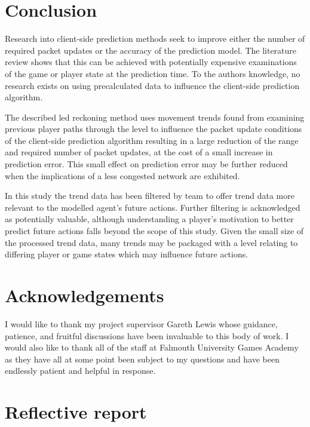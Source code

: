 \documentclass[journal]{IEEEtran}
\begin{document}
\section{Conclusion}

Research into client-side prediction methods seek to improve either the number of required packet updates or the accuracy of the prediction model. The literature review shows that this can be achieved with potentially expensive examinations of the game or player state at the prediction time. To the authors knowledge, no research exists on using precalculated data to influence the client-side prediction algorithm.

The described led reckoning method uses movement trends found from examining previous player paths through the level to influence the packet update conditions of the client-side prediction algorithm resulting in a large reduction of the range and required number of packet updates, at the cost of a small increase in prediction error. This small effect on prediction error may be further reduced when the implications of a less congested network are exhibited.

In this study the trend data has been filtered by team to offer trend data more relevant to the modelled agent's future actions. Further filtering is acknowledged as potentially valuable, although understanding a player's motivation to better predict future actions falls beyond the scope of this study. Given the small size of the processed trend data, many trends may be packaged with a level relating to differing player or game states which may influence future actions.






\appendices
\section{Acknowledgements}

I would like to thank my project supervisor Gareth Lewis whose guidance, patience, and fruitful discussions have been invaluable to this body of work. I would also like to thank all of the staff at Falmouth University Games Academy as they have all at some point been subject to my questions and have been endlessly patient and helpful in response.

\section{Reflective report}
\end{document}
